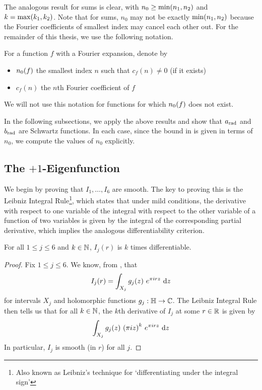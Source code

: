 The analogous result for sums is clear, with $n_0 \geq \min\!\left( n_1, n_2 \right)$ and $k = \max\!\left( k_1, k_2 \right)$. Note that for sums, $n_0$ may not be exactly $\min\!\left( n_1, n_2 \right)$ because the Fourier coefficients of smallest index may cancel each other out. For the remainder of this thesis, we use the following notation.

\begin{boxnotation}
    For a function $f$ with a Fourier expansion, denote by
    \begin{itemize}
        \item $n_0\!\left( f \right)$ the smallest index $n$ such that $c_f(n) \neq 0$ (if it exists)
        \item $c_f(n)$ the $n$th Fourier coefficient of $f$
    \end{itemize}
    We will not use this notation for functions for which $n_0\!\left( f \right)$ does not exist.
\end{boxnotation}

In the following subsections, we apply the above results and show that $a_{\operatorname{rad}}$ and $b_{\operatorname{rad}}$ are Schwartz functions. In each case, since the bound in  is given in terms of $n_0$, we compute the values of $n_0$ explicitly.

\subsection{The $+1$-Eigenfunction}
\label{Ch4:Subec:Schwartzness_a}

We begin by proving that $I_1, \ldots, I_6$ are smooth. The key to proving this is the Leibniz Integral Rule\footnote{Also known as Leibniz's technique for `differentiating under the integral sign'}, which states that under mild conditions, the derivative with respect to one variable of the integral with respect to the other variable of a function of two variables is given by the integral of the corresponding partial derivative, which implies the analogous differentiability criterion.

\begin{boxlemma}
    For all $1 \leq j \leq 6$ and $k \in \mathbb{N}$, $I_j(r)$ is $k$ times differentiable.
\end{boxlemma}
\begin{proof}
    Fix $1 \leq j \leq 6$. We know, from , that
    \begin{align*}
        I_j(r) = \int_{X_j} g_j\!\left( z \right) \, e^{\pi i r z} \, \operatorname{d}\!{z}
    \end{align*}
    for intervals $X_j$ and holomorphic functions $g_j : \mathbb{H} \to \mathbb{C}$. The Leibniz Integral Rule then tells us that for all $k \in \mathbb{N}$, the $k$th derivative of $I_j$ at some $r \in \mathbb{R}$ is given by
    \begin{align}
        \int_{X_j} g_j\!\left( z \right) \, \left( \pi i z \right)^{k} \, e^{\pi i r z} \, \operatorname{d}\!{z}
        \label{Ch4:Eq:Ij_deriv}
    \end{align}
    In particular, $I_j$ is smooth (in $r$) for all $j$.
\end{proof}

